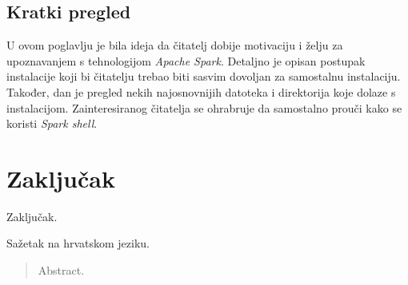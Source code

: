 \documentclass[times, utf8, zavrsni]{fer}
\begin{document}
\section{Kratki pregled}
U ovom poglavlju je bila ideja da čitatelj dobije motivaciju i želju za upoznavanjem s tehnologijom \emph{Apache Spark}. Detaljno je opisan postupak instalacije koji bi čitatelju trebao biti sasvim dovoljan za samostalnu instalaciju. Također, dan je pregled nekih najosnovnijih datoteka i direktorija koje dolaze s instalacijom. Zainteresiranog čitatelja se ohrabruje da samostalno prouči kako se koristi \emph{Spark shell}.

\chapter{Zaključak}
Zaključak.




\begin{sazetak}
Sažetak na hrvatskom jeziku.

\end{sazetak}

\begin{abstract}
Abstract.

\end{abstract}
\end{document}
